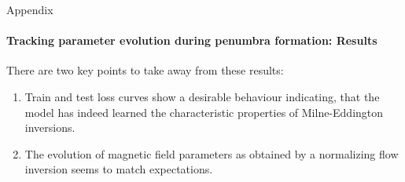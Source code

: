 \documentclass{beamer}
\begin{document}
\begin{frame}[allowframebreaks]{Appendix}
	\framesubtitle{Tracking parameter evolution during penumbra formation: Results} %
	There are two key points to take away from these results:
	\begin{enumerate}
		\item Train and test loss curves show a desirable behaviour indicating, that the model has indeed learned the characteristic properties of Milne-Eddington inversions.
		\item The evolution of magnetic field parameters as obtained by a normalizing flow inversion seems to match expectations.
	\end{enumerate}
\end{frame}
\end{document}
